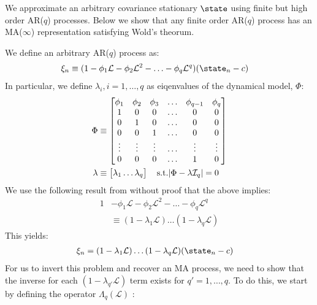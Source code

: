 We approximate an arbitrary covariance stationary $\state$ using finite but high order AR($q$) processes. Below we show that any finite order AR($q$) process has an MA($\infty$) representation satisfying Wold's theorum.

We define an arbitrary AR($q$) process as:
\begin{align}
\xi_n & \equiv (1 - \phi_1 \mathcal{L}  - \phi_2 \mathcal{L} ^2 - \hdots -\phi_q \mathcal{L} ^q) (\state_n - c)
\end{align}
In particular, we define $\lambda_i, i = 1, \hdots, q$ as eiqenvalues of the dynamical model, $\Phi$:
\begin{align}
\Phi &\equiv \begin{bmatrix} \phi_1 & \phi_2 & \phi_3 & \hdots & \phi_{q-1}  &\phi_q \\
1 & 0 & 0 & \hdots & 0 & 0 \\
0 & 1 & 0 & \hdots & 0 & 0 \\
0 & 0 & 1 & \hdots & 0 & 0 \\
\vdots & \vdots & \vdots & \hdots & \vdots & \vdots \\
0 & 0 & 0 & \hdots & 1 & 0 \\
 \end{bmatrix} \\
\bf{\lambda} & \equiv \begin{bmatrix} \lambda_1 \dots \lambda_q \end{bmatrix} \quad \text{s.t.} |\Phi - \lambda\mathcal{I}_q|  = 0 \\
\end{align}
We use the following result from \cite{hamilton1994time} without proof that the above implies:
\begin{align}
1 & - \phi_1 \mathcal{L}  - \phi_2 \mathcal{L}^2 - \hdots -\phi_q \mathcal{L}^q \\
&\equiv (1 - \lambda_1\mathcal{L}) \hdots (1 - \lambda_q \mathcal{L}) 
\end{align}
This yields:
\begin{align}
\xi_n & = (1 - \lambda_1 \mathcal{L}) \hdots (1 - \lambda_q \mathcal{L}) (\state_n - c) \label{eqn:app:ARMA:ar_p_1}
\end{align}
For us to invert this problem and recover an MA process, we need to show that the inverse for each $(1 - \lambda_{q'} \mathcal{L})$ term exists for $q' = 1, \hdots, q$. To do this, we start by defining the operator $\Lambda_q(\mathcal{L}) $ :
